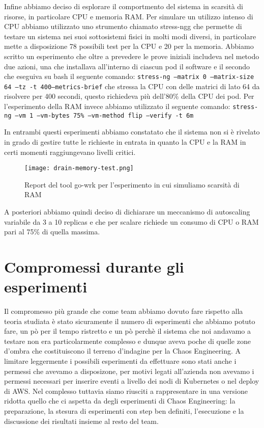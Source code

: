 Infine abbiamo deciso di esplorare il comportmento del sistema in scarsità di risorse, in particolare CPU e memoria RAM.
Per simulare un utilizzo intenso di CPU abbiamo utilizzato uno strumento chiamato \gls{stress-ngg} che permette di testare un sistema nei suoi sottosistemi fisici in molti modi diversi, in particolare mette a disposizione 78 possibili test per la CPU e 20 per la memoria.
Abbiamo scritto un esperimento che oltre a prevedere le prove iniziali includeva nel metodo due azioni, una che installava all'interno di ciascun pod il software e il secondo che eseguiva su bash il seguente comando:
\texttt{stress-ng –matrix 0 –matrix-size 64 –tz -t 400–metrics-brief}
che stressa la CPU con delle matrici di lato 64 da risolvere per 400 secondi, questo richiedeva più dell'80\% della CPU dei pod.
Per l'esperimento della RAM invece abbiamo utilizzato il seguente comando:
\texttt{stress-ng --vm 1 --vm-bytes 75\% --vm-method flip --verify -t 6m}

In entrambi questi esperimenti abbiamo constatato che il sistema non si è rivelato in grado di gestire tutte le richieste in entrata in quanto la CPU e la RAM in certi momenti raggiungevano livelli critici.
\begin{figure}[h]
    \centering
    \texttt{[image: drain-memory-test.png]}
    \caption{Report del tool go-wrk per l'esperimento in cui simuliamo scarsità di RAM}
    \label{tab:report-drain-ram}
\end{figure}
A posteriori abbiamo quindi deciso di dichiarare un meccanismo di autoscaling variabile da 3 a 10 replicas e che per scalare richiede un consumo di CPU o RAM pari al 75\% di quella massima.

\section{Compromessi durante gli esperimenti}
Il compromesso più grande che come team abbiamo dovuto fare rispetto alla teoria studiata è stato sicuramente il numero di esperimenti che abbiamo potuto fare, un pò per il tempo ristretto e un pò perchè il sistema che noi andavamo a testare non era particolarmente complesso e dunque aveva poche di quelle zone d'ombra che costituiscono il terreno d'indagine per la Chaos Engineering.
A limitare leggermente i possibili esperimenti da effettuare sono stati anche i permessi che avevamo a disposizone, per motivi legati all'azienda non avevamo i permessi necessari per inserire eventi a livello dei nodi di Kubernetes o nel deploy di AWS.
Nel complesso tuttavia siamo riusciti a rappresentare in una versione ridotta quello che ci aspetta da degli esperimenti di Chaos Engineering: la preparazione, la stesura di esperimenti con step ben definiti, l'esecuzione e la discussione dei risultati insieme al resto del team.

